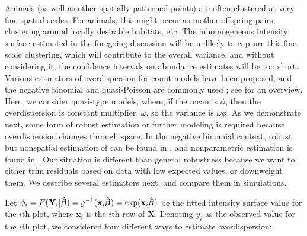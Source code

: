 \documentclass[12pt, titlepage]{article}\usepackage[]{graphicx}\usepackage[]{color}
\newcommand{\bx}{\ensuremath{\mathbf{x}}}
\def\bX{\mathbf{X}}
\def\bY{\mathbf{Y}}
\def\bbeta{\mbox{\boldmath $\beta$}}
\begin{document}
Animals (as well as other spatially patterned points) are often clustered at very fine spatial scales. For animals, this might occur as mother-offspring pairs, clustering around locally desirable habitats, etc.  The inhomogeneous intensity surface estimated in the foregoing discussion will be unlikely to capture this fine scale clustering, which will contribute to the overall variance, and without considering it, the confidence intervals on abundance estimates will be too short. Various estimators of overdispersion for count models have been proposed, and the negative binomial and quasi-Poisson are commonly used \citep[e.g.,][]{Ver:Bove:quas:2007}; see \citet{Hind:Deme:over:1998} for an overview.  Here, we consider quasi-type models, where, if the mean is $\phi$, then the overdispersion is constant multiplier, $\omega$, so the variance is $\omega \phi$.  As we demonstrate next, some form of robust estimation or further modeling is required because overdispersion changes through space.  In the negative binomial context, robust but nonspatial estimation of can be found in \citet{Moor:Tsia:robu:1991}, and nonparametric estimation is found in \citet{Gijb:Pros:Clae:nonp:2010}. Our situation is different than general robustness because we want to either trim residuals based on data with low expected values, or downweight them.  We describe several estimators next, and compare them in simulations.

Let $\phi_i = E(\bY_i|\hat{\bbeta}) = g^{-1}(\bx_i\hat{\bbeta}) = \exp(\bx_i\hat{\bbeta})$ be the fitted intensity surface value for the $i$th plot, where $\bx_i$ is the $i$th row of $\bX$.  Denoting $y_i$ as the observed value for the $i$th plot, we considered four different ways to estimate overdispersion:
\end{document}
